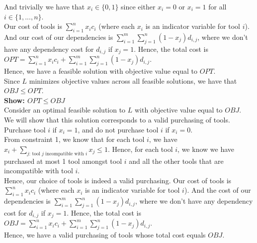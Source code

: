 \documentclass[12pt]{article}
\begin{document}
And trivially we have that $x_i \in \{0,1\}$ since either $x_i = 0$ or $x_i = 1$ for all $i \in \{1,...,n\}$. \\

Our cost of tools is $\sum\limits_{i=1}^n x_ic_i$ (where each $x_i$ is an indicator variable for tool $i$). And our cost of our dependencies is $\sum\limits_{i=1}^m \sum\limits_{j=1}^n (1-x_j)d_{i,j}$, where we don't have any dependency cost for $d_{i,j}$ if $x_j = 1$. Hence, the total cost is $OPT = \sum\limits_{i=1}^n x_ic_i + \sum\limits_{i=1}^m \sum\limits_{j=1}^n (1-x_j)d_{i,j}$. \\

Hence, we have a feasible solution with objective value equal to $OPT$. \\

Since $L$ minimizes objective values across all feasible solutions, we have that $OBJ \leq OPT$. \\

\textbf{Show: $OPT \leq OBJ$} \\

Consider an optimal feasible solution to $L$ with objective value equal to $OBJ$. \\

We will show that this solution corresponds to a valid purchasing of tools. \\

Purchase tool $i$ if $x_i = 1$, and do not purchase tool $i$ if $x_i = 0$. \\

From constraint 1, we know that for each tool $i$, we have $x_i + \sum_{\text{$j$: tool $j$ incompatible with $i$}} x_j \leq 1$. Hence, for each tool $i$, we know we have purchased at most 1 tool amongst tool $i$ and all the other tools that are incompatible with tool $i$. \\

Hence, our choice of tools is indeed a valid purchasing. Our cost of tools is $\sum\limits_{i=1}^n x_ic_i$ (where each $x_i$ is an indicator variable for tool $i$). And the cost of our dependencies is $\sum\limits_{i=1}^m \sum\limits_{j=1}^n (1-x_j)d_{i,j}$, where we don't have any dependency cost for $d_{i,j}$ if $x_j = 1$. Hence, the total cost is $OBJ = \sum\limits_{i=1}^n x_ic_i + \sum\limits_{i=1}^m \sum\limits_{j=1}^n (1-x_j)d_{i,j}$. \\

Hence, we have a valid purchasing of tools whose total cost equals $OBJ$. \\
\end{document}
